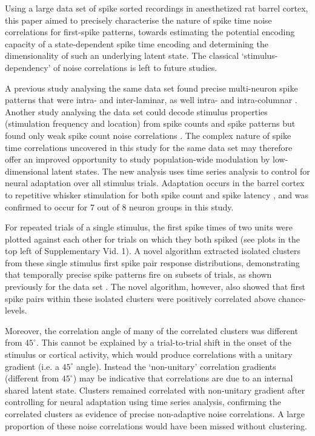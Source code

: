 \documentclass{article}
\begin{document}
Using a large data set of spike sorted recordings in anesthetized rat barrel cortex, this paper aimed to precisely characterise the nature of spike time noise correlations for first-spike patterns, towards estimating the potential encoding capacity of a state-dependent spike time encoding and determining the dimensionality of such an underlying latent state. The classical `stimulus-dependency' of noise correlations is left to future studies. 

A previous study analysing the same data set found precise multi-neuron spike patterns that were intra- and inter-laminar, as well intra- and intra-columnar \cite{reyes2014laminar}. Another study analysing the data set could decode stimulus properties (stimulation frequency and location) from spike counts and spike patterns but found only weak spike count noise correlations \cite{reyes2015high}. The complex nature of spike time correlations uncovered in this study for the same data set may therefore offer an improved opportunity to study population-wide modulation by low-dimensional latent states. The new analysis uses time series analysis to control for neural adaptation over all stimulus trials. Adaptation occurs in the barrel cortex to repetitive whisker stimulation for both spike count \cite{ahissar2000transformation, ahissar2001temporal, kheradpezhouh2017response, khatri2009stimulus, martin2014tactile, barros2019response} and spike latency \cite{ahissar2000transformation, ahissar2001temporal, kheradpezhouh2017response}, and was confirmed to occur for 7 out of 8 neuron groups in this study. 


For repeated trials of a single stimulus, the first spike times of two units were plotted against each other for trials on which they both spiked (see plots in the top left of Supplementary Vid. 1). A novel algorithm extracted isolated clusters from these single stimulus first spike pair response distributions, demonstrating that temporally precise spike patterns fire on subsets of trials, as shown previously for the data set \cite{reyes2014laminar}. The novel algorithm, however, also showed that first spike pairs within these isolated clusters were positively correlated above chance-levels. 

Moreover, the correlation angle of many of the correlated clusters was different from $45^{\circ}$. This cannot be explained by a trial-to-trial shift in the onset of the stimulus or cortical activity, which would produce correlations with a unitary gradient (i.e. a $45^{\circ}$ angle). Instead the `non-unitary' correlation gradients (different from $45^{\circ}$) may be indicative that correlations are due to an internal shared latent state. Clusters remained correlated with non-unitary gradient after controlling for neural adaptation using time series analysis, confirming the correlated clusters as evidence of precise non-adaptive noise correlations. A large proportion of these noise correlations would have been missed without clustering. 
\end{document}
